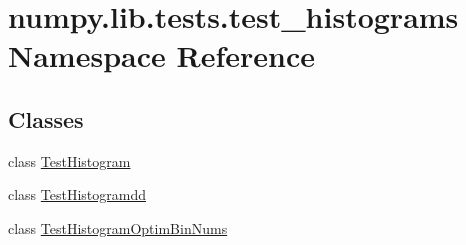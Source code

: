 \hypertarget{namespacenumpy_1_1lib_1_1tests_1_1test__histograms}{}\section{numpy.\+lib.\+tests.\+test\+\_\+histograms Namespace Reference}
\label{namespacenumpy_1_1lib_1_1tests_1_1test__histograms}
\subsection*{Classes}
\begin{DoxyCompactItemize}
\item 
class \hyperlink{classnumpy_1_1lib_1_1tests_1_1test__histograms_1_1TestHistogram}{Test\+Histogram}
\item 
class \hyperlink{classnumpy_1_1lib_1_1tests_1_1test__histograms_1_1TestHistogramdd}{Test\+Histogramdd}
\item 
class \hyperlink{classnumpy_1_1lib_1_1tests_1_1test__histograms_1_1TestHistogramOptimBinNums}{Test\+Histogram\+Optim\+Bin\+Nums}
\end{DoxyCompactItemize}
